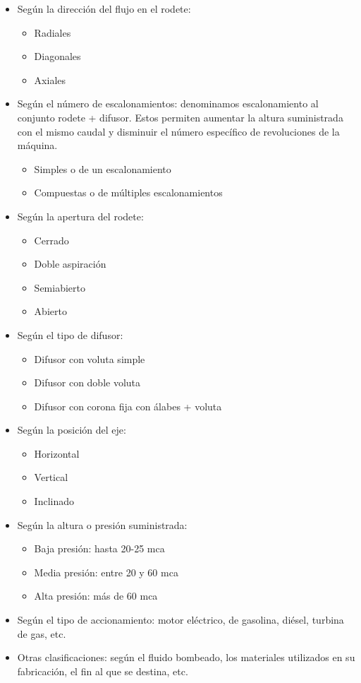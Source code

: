 \begin{itemize}
    \item Según la dirección del flujo en el rodete:
    \begin{itemize}
        \item Radiales
        \item Diagonales
        \item Axiales
    \end{itemize}
    \item Según el número de escalonamientos: denominamos escalonamiento al conjunto rodete + difusor. Estos permiten aumentar la altura suministrada con el mismo caudal y disminuir el número específico de revoluciones de la máquina.
    \begin{itemize}
        \item Simples o de un escalonamiento
        \item Compuestas o de múltiples escalonamientos
    \end{itemize}
    \item Según la apertura del rodete:
    \begin{itemize}
        \item Cerrado
        \item Doble aspiración
        \item Semiabierto
        \item Abierto
    \end{itemize}
    \item Según el tipo de difusor:
    \begin{itemize}
        \item Difusor con voluta simple
        \item Difusor con doble voluta
        \item Difusor con corona fija con álabes + voluta
    \end{itemize}
    \item Según la posición del eje:
    \begin{itemize}
        \item Horizontal
        \item Vertical
        \item Inclinado
    \end{itemize}
    \item Según la altura o presión suministrada:
    \begin{itemize}
        \item Baja presión: hasta 20-25 mca
        \item Media presión: entre 20 y 60 mca
        \item Alta presión: más de 60 mca
    \end{itemize}
    \item Según el tipo de accionamiento: motor eléctrico, de gasolina, diésel, turbina de gas, etc.
    \item Otras clasificaciones: según el fluido bombeado, los materiales utilizados en su fabricación, el fin al que se destina, etc.
\end{itemize}

